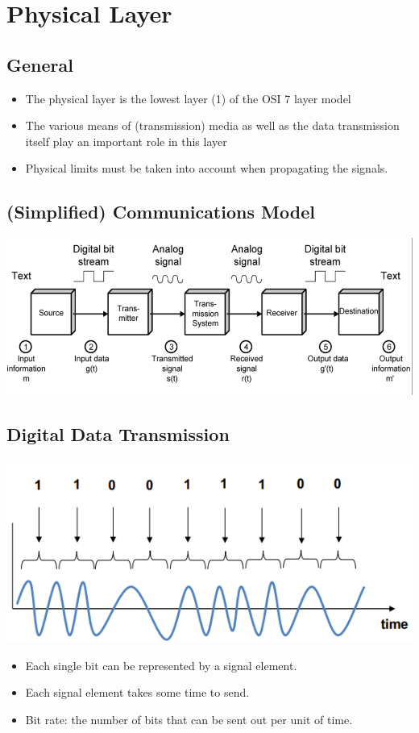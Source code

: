 \documentclass[11pt]{article}
\begin{document}
\section{Physical Layer}
\subsection{General}
\begin{itemize}
    \item The physical layer is the lowest layer (1) of the OSI 7 layer model 
    \item The various means of (transmission) media as well as the data transmission itself play an important role in this layer
    \item Physical limits must be taken into account when propagating the signals.
\end{itemize}
\subsection{(Simplified) Communications Model}
\includegraphics[width=\textwidth]{simplified-comunications-model}
\subsection{Digital Data Transmission}
\includegraphics[width=\textwidth]{digital-data-transmission}
\begin{itemize}
    \item Each single bit can be represented by a signal element.
    \item Each signal element takes some time to send.
    \item Bit rate: the number of bits that can be sent out per unit of time.
\end{itemize}
\end{document}
